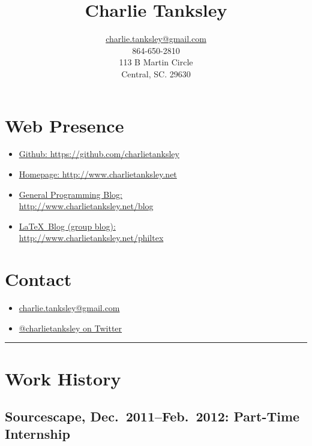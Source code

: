 \documentclass{article}
\title{Charlie Tanksley}
\author{\href{mailto:charlie.tanksley@gmail.com}{charlie.tanksley@gmail.com}\\
        864-650-2810\\
        113 B Martin Circle\\
        Central, SC. 29630}
\date{\nodate}
\begin{document}
\setlength{\droptitle}{-1in}
\maketitle
\thispagestyle{fancy}

\begin{multicols}{2}

\section{Web Presence} %
\label{sec:Web Presence}

\begin{itemize}
  \item \href{https://github.com/charlietanksley}{Github:
    https://github.com/charlietanksley}
  \item \href{http://www.charlietanksley.net}{Homepage:
    http://www.charlietanksley.net}
  \item \href{http://www.charlietanksley.net/blog}{General Programming Blog:\\
    http://www.charlietanksley.net/blog}
  \item \href{http://www.charlietanksley.net/philtex}{\LaTeX\ Blog (group blog):\\
    http://www.charlietanksley.net/philtex}
\end{itemize}

\columnbreak
\section{Contact} %
\label{sec:Contact}

\begin{itemize}
  \item 
    \href{mailto:charlie.tanksley@gmail.com}{charlie.tanksley@gmail.com}
  \item \href{http://www.twitter.com/charlietanksley}{@charlietanksley 
    on Twitter}
\end{itemize}


\end{multicols}
\hrule
\section{Work History} %
\label{sec:Relevant Work History}

  \subsection{Sourcescape, Dec.\ 2011--Feb.\ 2012: Part-Time 
  Internship}
  \label{sub:Sourcescape}
\end{document}

